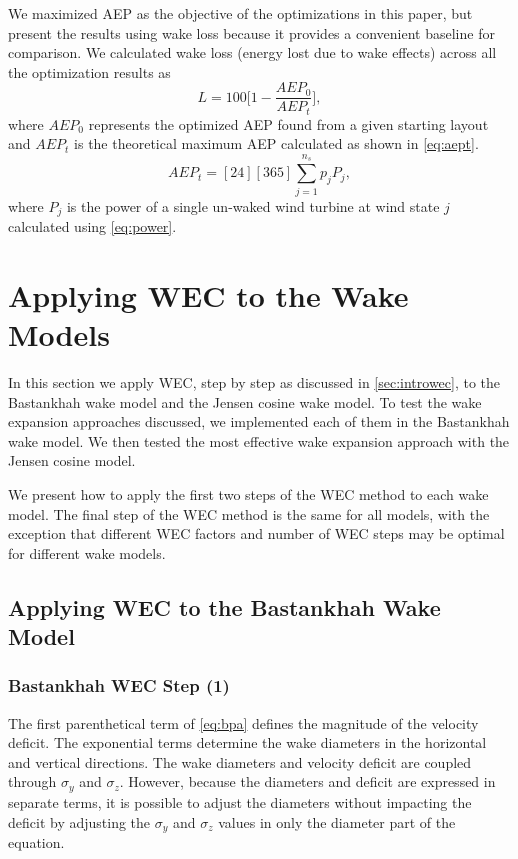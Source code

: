\documentclass{jpconf}
\begin{document}
We maximized AEP as the objective of the optimizations in this paper, but present the results using wake loss because it provides a convenient baseline for comparison. We calculated wake loss (energy lost due to wake effects) across all the optimization results as
%
\begin{equation} \label{eq:wake_loss}
	L = 100 \bigg[ 1 - \frac{AEP_0}{AEP_t} \bigg],
\end{equation}
%
where $AEP_0$ represents the optimized AEP found from a given starting layout and $AEP_t$ is the theoretical maximum AEP calculated as shown in \cref{eq:aept}. 
%
\begin{equation} \label{eq:aept}
	AEP_t = [24][365]\sum_{j=1}^{n_s}p_j P_j,
\end{equation}
%
where $P_j$ is the power of a single un-waked wind turbine at wind state $j$ calculated using \cref{eq:power}. 


\section{Applying WEC to the  Wake Models} \label{sec:application}
In this section we apply WEC, step by step as discussed in \cref{sec:introwec}, to the Bastankhah wake model and the Jensen cosine wake model. To test the wake expansion approaches discussed, we implemented each of them in the Bastankhah  wake model. We then tested the most effective wake expansion approach with the Jensen cosine model.

We present how to apply the first two steps of the WEC method to each wake model. The final step of the WEC method is the same for all models, with the exception that different WEC factors and number of WEC steps may be optimal for different wake models.

\subsection{Applying WEC to the Bastankhah Wake Model}

\subsubsection{Bastankhah WEC Step (1)}
The first parenthetical term of \cref{eq:bpa} defines the magnitude of the velocity deficit. The exponential terms determine the wake diameters in the horizontal and vertical directions. The wake diameters and velocity deficit are coupled through $\sigma_y$ and $\sigma_z$. However, because the diameters and deficit are expressed in separate terms, it is possible to adjust the diameters without impacting the deficit by adjusting the $\sigma_y$ and $\sigma_z$ values in only the diameter part of the equation. 
\end{document}
